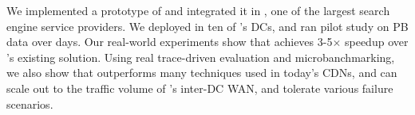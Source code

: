 We implemented a prototype of \name and integrated it in 
\company, one of the largest search engine service
providers. We deployed \name in ten of \company's DCs, and 
ran pilot study on \fillme PB data over \fillme days. Our
real-world experiments show that \name achieves 3-5$\times$ 
speedup over \company's existing solution. 
Using real trace-driven evaluation and microbanchmarking, 
we also show that \name outperforms many techniques used in 
today's CDNs, and \name can scale out to the traffic volume 
of \company's inter-DC WAN, and tolerate various failure 
scenarios.
